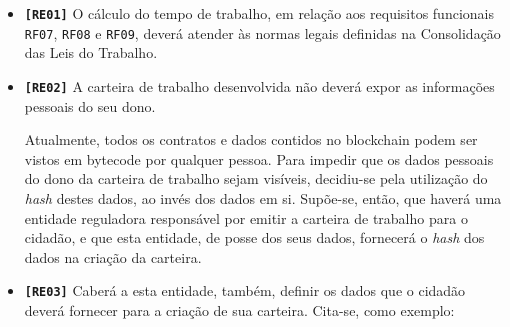 \documentclass[a4paper,10pt]{article}
\begin{document}
\begin{itemize}
  \item \textbf{\texttt{[RE01]}} O cálculo do tempo de trabalho, em relação aos requisitos funcionais \texttt{RF07}, \texttt{RF08} e \texttt{RF09}, deverá atender às normas legais definidas na Consolidação das Leis do Trabalho.
  \item \textbf{\texttt{[RE02]}} A carteira de trabalho desenvolvida não deverá expor as informações pessoais do seu dono.

  Atualmente, todos os contratos e dados contidos no blockchain podem ser vistos em bytecode por qualquer pessoa. Para impedir que os dados pessoais do dono da carteira de trabalho sejam visíveis, decidiu-se pela utilização do \emph{hash} destes dados, ao invés dos dados em si. Supõe-se, então, que haverá uma entidade reguladora responsável por emitir a carteira de trabalho para o cidadão, e que esta entidade, de posse dos seus dados, fornecerá o \emph{hash} dos dados na criação da carteira.

  \item \textbf{\texttt{[RE03]}} Caberá a esta entidade, também, definir os dados que o cidadão deverá fornecer para a criação de sua carteira. Cita-se, como exemplo:


\end{itemize}
\end{document}
